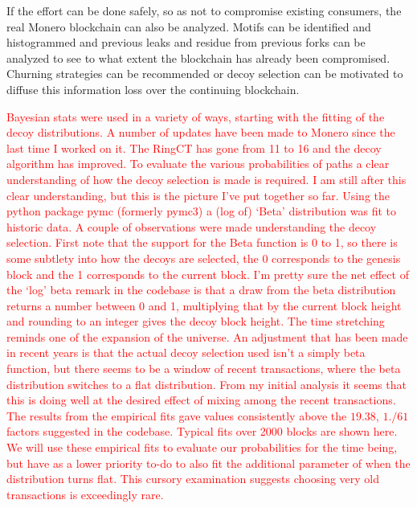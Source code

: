 \documentclass[prc, 12pt]{revtex4-1}
\begin{document}
If the effort can be done safely, so as not to compromise existing consumers, the real Monero blockchain can also be analyzed.  Motifs can be identified and histogrammed and previous leaks and residue from previous forks can be analyzed to see to what extent the blockchain has already been compromised.  Churning strategies can be recommended or decoy selection can be motivated to diffuse this information loss over the continuing blockchain.

\textcolor{red}{Bayesian stats were used in a variety of ways, starting with the fitting of the decoy distributions.  A number of updates have been made to Monero since the last time I worked on it.  The RingCT has gone from 11 to 16 and the decoy algorithm has improved.  To evaluate the various probabilities of paths a clear understanding of how the decoy selection is made is required.  I am still after this clear understanding, but this is the picture I've put together so far.  Using the python package pymc (formerly pymc3) a (log of) `Beta' distribution was fit to historic data.  A couple of observations were made understanding the decoy selection.  First note that the support for the Beta function is 0 to 1, so there is some subtlety into how the decoys are selected, the 0 corresponds to the genesis block and the 1 corresponds to the current block.  I'm pretty sure the net effect of the `log' beta remark in the codebase is that a draw from the beta distribution returns a number between 0 and 1, multiplying that by the current block height and rounding to an integer gives the decoy block height.  The time stretching reminds one of the expansion of the universe. An adjustment that has been made in recent years is that the actual decoy selection used isn't a simply beta function, but there seems to be a window of recent transactions, where the beta distribution switches to a flat distribution.  From my initial analysis it seems that this is doing well at the desired effect of mixing among the recent transactions.}
\textcolor{red}{The results from the empirical fits gave values consistently above the $19.38$, $1./61$ factors suggested in the codebase.  Typical fits over 2000 blocks are shown here.  We will use these empirical fits to evaluate our probabilities for the time being, but have as a lower priority to-do to also fit the additional parameter of when the distribution turns flat.  This cursory examination suggests choosing very old transactions is exceedingly rare.}
\end{document}
